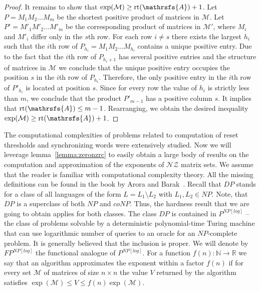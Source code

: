 \documentclass[a4paper,USenglish]{lipics}
\DeclareMathOperator{\rt}{rt}
\theoremstyle{definition}
\begin{document}
\begin{proof}
It remains to show that $\exp(\mathcal{M}) \geq \rt(\mathrsfs{A}) + 1$. Let $P=M_1M_2 \ldots M_m$ be the shortest positive product of matrices in $\mathcal{M}$. Let $P' = M'_1M'_2 \ldots M'_m$ be the corresponding product of matrices in $\mathcal{M'}$, where $M_i$ and $M'_i$ differ only in the $s$th row. For each row $i \neq s$ there exists the largest $h_i$ such that the $i$th row of $P_{h_i}=M_1M_2 \ldots M_{h_i}$ contains a unique positive entry. 
Due to the fact that the $i$th row of $P_{h_i+1}$ has several positive entries and the structure of matrices in $\mathcal{M}$ we conclude that the unique positive entry occupies the position $s$ in the $i$th row of $P_{h_i}$. 
Therefore, the only positive entry in the $i$th row of $P'_{h_i}$ is located at position $s$. Since for every row the value of $h_i$ is strictly less than $m$, we conclude that the product $P'_{m-1}$ has a positive column $s$. It implies that $\rt(\mathrsfs{A}) \leq m-1$. Rearranging, we obtain the desired inequality $\exp(\mathcal{M}) \geq \rt(\mathrsfs{A}) + 1$.
\end{proof}

The computational complexities of problems related to computation of reset thresholds and synchronizing words were extensively studied. Now we will leverage lemma~\ref{lemma:zeronzrc} to easily obtain a large body of results on the computation and approximation of the exponents of $\mathscr{NZ}$ matrix sets. We assume that the reader is familiar with computational complexity theory. All the missing definitions can be found in the book by Arora and Barak~\cite{Aro09}. Recall that $DP$ stands for a class of all languages of the form $L=L_1 \setminus L_2$ with $L_1, L_2 \in NP$. Note, that $DP$ is a superclass of both $NP$ and $coNP$. Thus, the hardness result that we are going to obtain applies for both classes. The class $DP$ is contained in $P^{NP[log]}$ -- the class of problems solvable by a deterministic polynomial-time Turing machine that can use logarithmic number of queries to an oracle for an $NP$-complete problem. It is generally believed that the inclusion is proper. We will denote by $FP^{NP[log]}$ the functional analogue of $P^{NP[log]}$. For a function $f(n) : \mathbb{N} \rightarrow \mathbb{R}$ we say that an algorithm approximates the exponent 
within a factor $f(n)$ if for every set $\mathcal{M}$ of matrices of size $n \times n$ the value $V$ returned by the algorithm satisfies $\exp(\mathcal{M}) \leq V \leq f(n) \exp(\mathcal{M})$.
\end{document}
